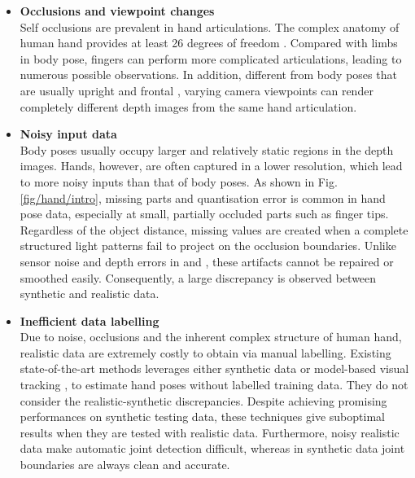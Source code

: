 \begin{itemize} 

\item{\textbf{Occlusions and viewpoint changes}} \\  
Self occlusions are prevalent in hand articulations. The complex anatomy of human hand provides at least 26 degrees of freedom \cite{Rehg1995, Holden1995}. Compared with limbs in body pose, fingers can perform more complicated articulations, leading to numerous possible observations. In addition, different from body poses that are usually upright and frontal \cite{Eichner2012}, varying camera viewpoints can render completely different depth images from the same hand articulation. 

\item{\textbf{Noisy input data}} \\ 
Body poses usually occupy larger and relatively static regions in the depth images. 
Hands, however, are often captured in a lower resolution, which lead to more noisy inputs than that of body poses. 
As shown in Fig. \ref{fig/hand/intro}, missing parts and quantisation error is common in hand pose data, especially at small, partially occluded parts such as finger tips. 
Regardless of the object distance, missing values are created when a complete structured light patterns fail to project on the occlusion boundaries. 
Unlike sensor noise and depth errors in \cite{Girshick2011} and \cite{Baak2011}, these artifacts cannot be repaired or smoothed easily. Consequently, a large discrepancy is observed between synthetic and realistic data.  

\item{\textbf{Inefficient data labelling}} \\ 
Due to noise, occlusions and the inherent complex structure of human hand, realistic data are extremely costly to obtain via manual labelling. 
Existing state-of-the-art methods leverages either synthetic data \cite{Keskin2012} or model-based visual tracking \cite{LaGorce2011, Oikonomidis2012}, to estimate hand poses without labelled training data. 
They do not consider the realistic-synthetic discrepancies. 
Despite achieving promising performances on synthetic testing data, these techniques give suboptimal results when they are tested with realistic data. 
Furthermore, noisy realistic data make automatic joint detection difficult, whereas in synthetic data joint boundaries are always clean and accurate.
\end{itemize} 

